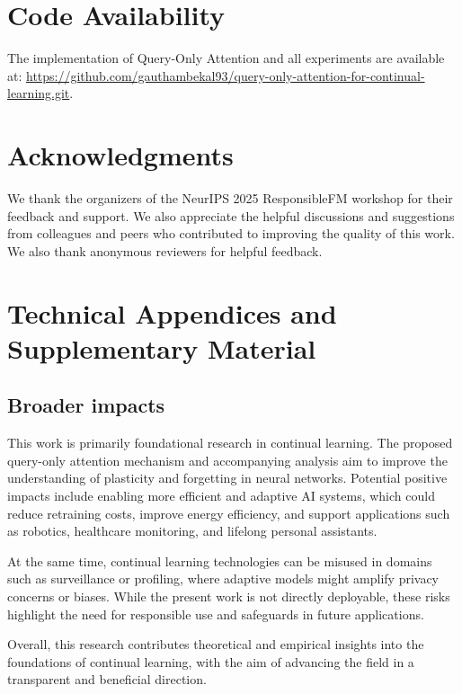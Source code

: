 \documentclass{article}
\begin{document}
\clearpage

\section*{Code Availability}
The implementation of Query-Only Attention and all experiments are available at:
\url{https://github.com/gauthambekal93/query-only-attention-for-continual-learning.git}.

\section*{Acknowledgments}
We thank the organizers of the NeurIPS 2025 ResponsibleFM workshop for their feedback and support. We also appreciate the helpful discussions and suggestions from colleagues and peers who contributed to improving the quality of this work.
We also thank anonymous reviewers for helpful feedback.






\appendix


\section{Technical Appendices and Supplementary Material}


\subsection{Broader impacts}
\label{sec:broader_impacts}
This work is primarily foundational research in continual learning. 
The proposed query-only attention mechanism and accompanying analysis aim to improve the 
understanding of plasticity and forgetting in neural networks. 
Potential positive impacts include enabling more efficient and adaptive AI systems, 
which could reduce retraining costs, improve energy efficiency, and support applications 
such as robotics, healthcare monitoring, and lifelong personal assistants.  

At the same time, continual learning technologies can be misused in domains such as 
surveillance or profiling, where adaptive models might amplify privacy concerns or biases.  
While the present work is not directly deployable, these risks highlight the need for 
responsible use and safeguards in future applications.  

Overall, this research contributes theoretical and empirical insights into the foundations 
of continual learning, with the aim of advancing the field in a transparent and beneficial direction.
\end{document}

